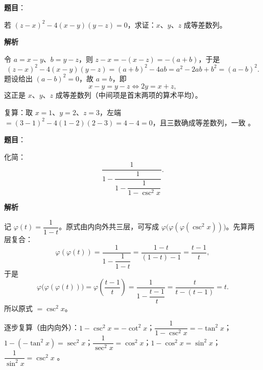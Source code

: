 \begin{answer}

\textbf{题目}：

若 $(z-x)^2-4(x-y)(y-z)=0$，求证：$x$、$y$、$z$ 成等差数列。

\textbf{解析}

令 $a=x-y$、$b=y-z$，则 $z-x=-(x-z)=-(a+b)$，于是
\nopagebreak[4]
\[
(z-x)^2-4(x-y)(y-z)=(a+b)^2-4ab=a^2-2ab+b^2=(a-b)^2.
\]
题设给出 $(a-b)^2=0$，故 $a=b$，即
\nopagebreak[4]
\[
x-y=y-z\iff 2y=x+z,
\]
这正是 $x$、$y$、$z$ 成等差数列（中间项是首末两项的算术平均）。

复算：取 $x=1$、$y=2$、$z=3$，左端 $=(3-1)^2-4(1-2)(2-3)=4-4=0$，且三数确成等差数列，一致 。


\end{answer}
\begin{answer}

\textbf{题目}：

化简：
\nopagebreak[4]
\[
\frac{1}{1-\dfrac{1}{1-\dfrac{1}{1-\csc^2x}}}.
\]

\textbf{解析}

记 $\varphi(t)=\dfrac{1}{1-t}$。原式由内向外共三层，可写成 $\varphi\bigl(\varphi(\varphi(\csc^2x))\bigr)$。先算两层复合：
\nopagebreak[4]
\[
\varphi(\varphi(t))=\frac{1}{1-\dfrac{1}{1-t}}=\frac{1-t}{(1-t)-1}=\frac{t-1}{t},
\]
于是
\nopagebreak[4]
\[
\varphi\bigl(\varphi(\varphi(t))\bigr)=\varphi\!\left(\frac{t-1}{t}\right)
=\frac{1}{1-\dfrac{t-1}{t}}=\frac{t}{t-(t-1)}=t.
\]
所以原式 $=\csc^2x$。

逐步复算（由内向外）：$1-\csc^2x=-\cot^2x$；$\dfrac{1}{1-\csc^2x}=-\tan^2x$；$1-(-\tan^2x)=\sec^2x$；$\dfrac{1}{\sec^2x}=\cos^2x$；$1-\cos^2x=\sin^2x$；$\dfrac{1}{\sin^2x}=\csc^2x$ 。


\end{answer}
